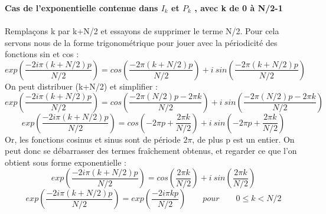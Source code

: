 \documentclass{article}
\begin{document}
\noindent\qquad \textbf{Cas de l'exponentielle contenue dans $I_{k}$ et $P_{k}$ , avec k de 0 à N/2-1}\\~\\
Remplaçons k par k+N/2 et essayons de supprimer le terme N/2. Pour cela servons nous de la forme trigonométrique pour jouer avec la périodicité des fonctions sin et cos :
\begin{equation}
	exp(\frac{-2i\pi (k+N/2)p}{N/2}) = cos(\frac{-2\pi (k+N/2)p}{N/2})+i\:sin(\frac{-2\pi (k+N/2)p}{N/2})
\end{equation}
On peut distribuer (k+N/2) et simplifier :
\begin{equation}
	exp(\frac{-2i\pi (k+N/2)p}{N/2}) = cos(\frac{-2\pi (N/2)p-2\pi k}{N/2})+i\:sin(\frac{-2\pi (N/2)p-2\pi k}{N/2})
\end{equation}
\begin{equation}
	exp(\frac{-2i\pi (k+N/2)p}{N/2}) = cos(-2\pi p+\frac{2\pi k}{N/2})+i\:sin(-2\pi p+\frac{2\pi k}{N/2})
\end{equation}
Or, les fonctions cosinus et sinus sont de période $2\pi$, de plus p est un entier. On peut donc se débarrasser des termes fraîchement obtenus, et regarder ce que l'on obtient sous forme exponentielle :
\begin{equation}
	exp(\frac{-2i\pi (k+N/2)p}{N/2}) = cos(\frac{2\pi k}{N/2})+i\:sin(\frac{2\pi k}{N/2})
\end{equation}
\begin{equation}
	exp(\frac{-2i\pi (k+N/2)p}{N/2}) = exp(\frac{-2i\pi kp}{N/2}) \qquad pour \qquad 0 \leq k < N/2
\end{equation}
\end{document}
